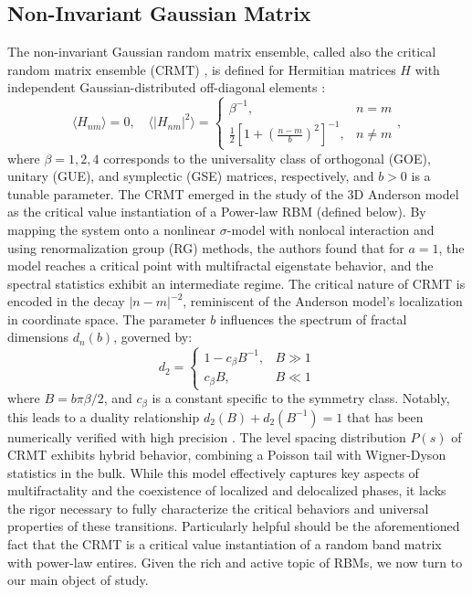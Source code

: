 \documentclass[11pt]{article}
\begin{document}
\subsection*{Non-Invariant Gaussian Matrix}
The non-invariant Gaussian random matrix ensemble, called also the critical random matrix ensemble (CRMT) \cite{mirlin1996}, is defined for Hermitian matrices \( H \) with independent Gaussian-distributed off-diagonal elements \cite{kravtsov2009}:$$
\langle H_{nm} \rangle = 0, \quad \langle |H_{nm}|^2 \rangle = 
\begin{cases} 
\beta^{-1}, & n = m \\ 
\frac{1}{2} \left[ 1 + \left( \frac{n - m}{b} \right)^2 \right]^{-1}, & n \neq m 
\end{cases}
,$$
where \( \beta = 1, 2, 4 \) corresponds to the universality class of orthogonal (GOE), unitary (GUE), and symplectic (GSE) matrices, respectively, and \( b > 0 \) is a tunable parameter. The CRMT emerged in the study of the 3D Anderson model as the critical value  instantiation of a Power-law RBM (defined below). By mapping the system onto a nonlinear $\sigma$-model with nonlocal interaction and using renormalization group (RG) methods, the authors found that for $a = 1$, the model reaches a critical point with multifractal eigenstate behavior, and the spectral statistics exhibit an intermediate regime. The critical nature of CRMT is encoded in the decay \( |n - m|^{-2} \), reminiscent of the Anderson model's localization in coordinate space. The parameter \( b \) influences the spectrum of fractal dimensions \( d_n(b) \), governed by:
\[
d_2 = 
\begin{cases} 
1 - c_\beta B^{-1}, & B \gg 1 \\ 
c_\beta B, & B \ll 1 
\end{cases}
\]
where \( B = b \pi \beta/2 \), and \( c_\beta \) is a constant specific to the symmetry class. Notably, this leads to a duality relationship \( d_2(B) + d_2(B^{-1}) = 1 \) that has been numerically verified with high precision \cite{kravtsov2009}. The level spacing distribution \( P(s) \) of CRMT exhibits hybrid behavior, combining a Poisson tail with Wigner-Dyson statistics in the bulk. While this model effectively captures key aspects of multifractality and the coexistence of localized and delocalized phases, it lacks the rigor necessary to fully characterize the critical behaviors and universal properties of these transitions. Particularly helpful should be the aforementioned fact that the CRMT is a critical value instantiation of a random band matrix with power-law entires. Given the rich and active topic of RBMs, we now turn to our main object of study.  
\end{document}
